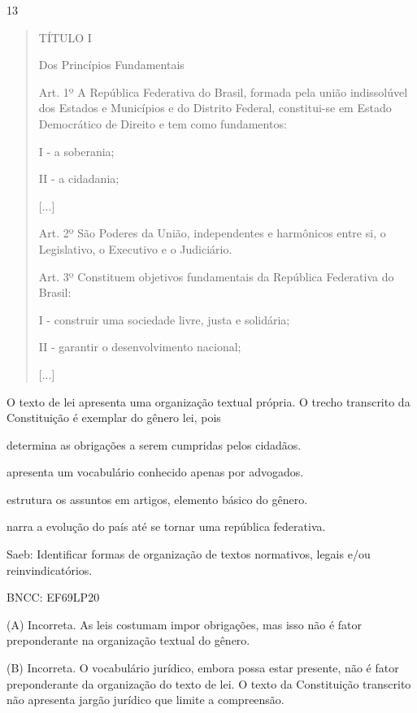 \num{13}

\begin{quote}
TÍTULO I

Dos Princípios Fundamentais

Art. 1º A República Federativa do Brasil, formada pela união
indissolúvel dos Estados e Municípios e do Distrito Federal,
constitui-se em Estado Democrático de Direito e tem como fundamentos:

I - a soberania;

II - a cidadania;

{[}...{]}

Art. 2º São Poderes da União, independentes e harmônicos entre si, o
Legislativo, o Executivo e o Judiciário.

Art. 3º Constituem objetivos fundamentais da República Federativa do
Brasil:

I - construir uma sociedade livre, justa e solidária;

II - garantir o desenvolvimento nacional;

{[}...{]}
\end{quote}

O texto de lei apresenta uma organização textual própria. O trecho
transcrito da Constituição é exemplar do gênero lei, pois

\begin{escolha}
\item determina as obrigações a serem cumpridas pelos cidadãos.

\item apresenta um vocabulário conhecido apenas por advogados.

\item estrutura os assuntos em artigos, elemento básico do gênero.

\item narra a evolução do país até se tornar uma república federativa.
\end{escolha}

Saeb: Identificar formas de organização de textos normativos, legais
e/ou reinvindicatórios.

BNCC: EF69LP20

(A) Incorreta. As leis costumam impor obrigações, mas isso não é fator
preponderante na organização textual do gênero.

(B) Incorreta. O vocabulário jurídico, embora possa estar presente, não
é fator preponderante da organização do texto de lei. O texto da
Constituição transcrito não apresenta jargão jurídico que limite a
compreensão.


